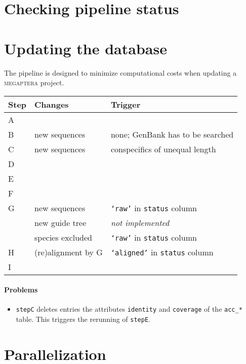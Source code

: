 \documentclass[12pt]{article}
\begin{document}
\section{Checking pipeline status}

\section{Updating the database}

The pipeline is designed to minimize computational costs when updating a \textsc{megaptera} project.
\vspace{\baselineskip}


\begin{tabular}{lll}
\hline
Step&Changes&Trigger\\
\hline
A&&\\
\hline
B&new sequences&none; GenBank has to be searched\\
\hline
C&new sequences&conspecifics of unequal length\\
\hline
D&&\\
\hline
E&&\\
\hline
F&&\\
\hline
G&new sequences&\texttt{`raw'} in \texttt{status} column\\
 &new guide tree&\emph{not implemented}\\
  &species excluded&\texttt{`raw'} in \texttt{status} column\\
\hline
H&(re)alignment by G&\texttt{`aligned'} in \texttt{status} column\\
\hline
I&&\\
\hline
\end{tabular}

\paragraph{Problems}
\begin{itemize}
\item \texttt{stepC} deletes entries the attributes \texttt{identity} and \texttt{coverage} of the \texttt{acc\_*} table. This triggers the rerunning of \texttt{stepE}.
\end{itemize}


\section{Parallelization}
\end{document}
